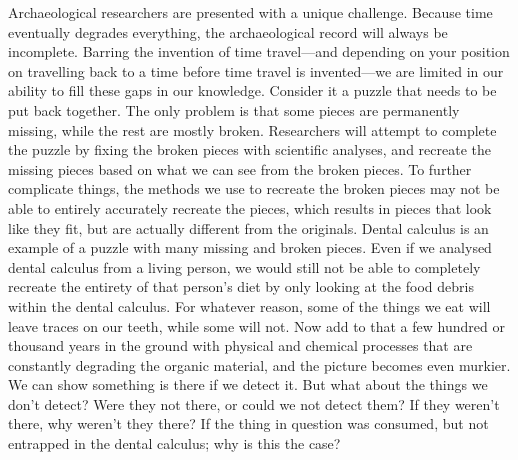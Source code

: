 \documentclass[
  b5paper,
]{book}
\begin{document}
Archaeological researchers are presented with a unique challenge.
Because time eventually degrades everything, the archaeological record
will always be incomplete. Barring the invention of time travel---and
depending on your position on travelling back to a time before time
travel is invented---we are limited in our ability to fill these gaps in
our knowledge. Consider it a puzzle that needs to be put back together.
The only problem is that some pieces are permanently missing, while the
rest are mostly broken. Researchers will attempt to complete the puzzle
by fixing the broken pieces with scientific analyses, and recreate the
missing pieces based on what we can see from the broken pieces. To
further complicate things, the methods we use to recreate the broken
pieces may not be able to entirely accurately recreate the pieces, which
results in pieces that look like they fit, but are actually different
from the originals. Dental calculus is an example of a puzzle with many
missing and broken pieces. Even if we analysed dental calculus from a
living person, we would still not be able to completely recreate the
entirety of that person's diet by only looking at the food debris within
the dental calculus. For whatever reason, some of the things we eat will
leave traces on our teeth, while some will not. Now add to that a few
hundred or thousand years in the ground with physical and chemical
processes that are constantly degrading the organic material, and the
picture becomes even murkier. We can show something is there if we
detect it. But what about the things we don't detect? Were they not
there, or could we not detect them? If they weren't there, why weren't
they there? If the thing in question was consumed, but not entrapped in
the dental calculus; why is this the case?
\end{document}
